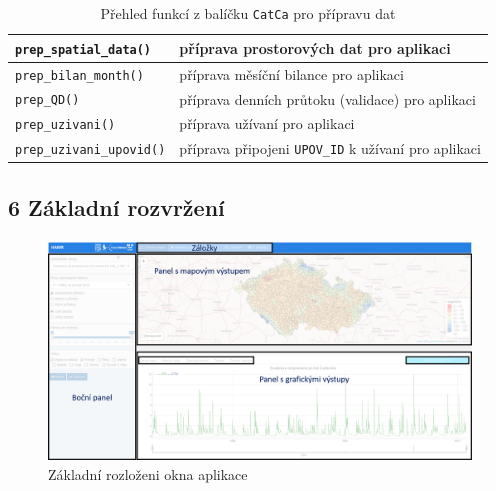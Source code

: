 \documentclass[12pt,]{article}
\begin{document}
\begin{table}[H]
\centering
\begin{tabular}{|l|l|}
\hline
\texttt{prep\_spatial\_data()}   & příprava prostorových dat pro aplikaci                     \\ \hline
\texttt{prep\_bilan\_month()}    & příprava měsíční bilance pro aplikaci                      \\ \hline
\texttt{prep\_QD()}             & příprava denních průtoku (validace) pro aplikaci  \\ \hline
\texttt{prep\_uzivani()}        & příprava užívaní pro aplikaci                              \\ \hline
\texttt{prep\_uzivani\_upovid()} & příprava připojeni \texttt{UPOV\_ID} k užívaní pro aplikaci \\ \hline
\end{tabular}
\caption{Přehled funkcí z balíčku \texttt{CatCa} pro přípravu dat}
\label{tab8}
\end{table}

\subsection{6 Základní rozvržení}\label{zakladni-rozvrzeni}

\begin{figure}[H]
      \includegraphics[width=\textwidth]{fig/rozlozeni2}
      \caption{Základní rozloženi okna aplikace}
      \label{fig:ch5.2}
\end{figure}
\end{document}
